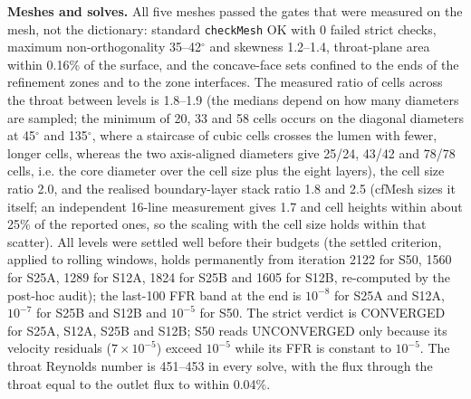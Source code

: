 \documentclass[11pt]{article}
\begin{document}
\textbf{Meshes and solves.} All five meshes passed the gates that were measured on the mesh, not the dictionary: standard \texttt{checkMesh} OK with 0 failed strict checks, maximum non-orthogonality 35--42$^\circ$ and skewness 1.2--1.4, throat-plane area within 0.16\% of the surface, and the concave-face sets confined to the ends of the refinement zones and to the zone interfaces. The measured ratio of cells across the throat between levels is 1.8--1.9 (the medians depend on how many diameters are sampled; the minimum of 20, 33 and 58 cells occurs on the diagonal diameters at 45$^\circ$ and 135$^\circ$, where a staircase of cubic cells crosses the lumen with fewer, longer cells, whereas the two axis-aligned diameters give 25/24, 43/42 and 78/78 cells, i.e. the core diameter over the cell size plus the eight layers), the cell size ratio 2.0, and the realised boundary-layer stack ratio 1.8 and 2.5 (cfMesh sizes it itself; an independent 16-line measurement gives 1.7 and cell heights within about 25\% of the reported ones, so the scaling with the cell size holds within that scatter). All levels were settled well before their budgets (the settled criterion, applied to rolling windows, holds permanently from iteration 2122 for S50, 1560 for S25A, 1289 for S12A, 1824 for S25B and 1605 for S12B, re-computed by the post-hoc audit); the last-100 FFR band at the end is $10^{-8}$ for S25A and S12A, $10^{-7}$ for S25B and S12B and $10^{-5}$ for S50. The strict verdict is CONVERGED for S25A, S12A, S25B and S12B; S50 reads UNCONVERGED only because its velocity residuals ($7\times10^{-5}$) exceed $10^{-5}$ while its FFR is constant to $10^{-5}$. The throat Reynolds number is 451--453 in every solve, with the flux through the throat equal to the outlet flux to within 0.04\%.
\end{document}
